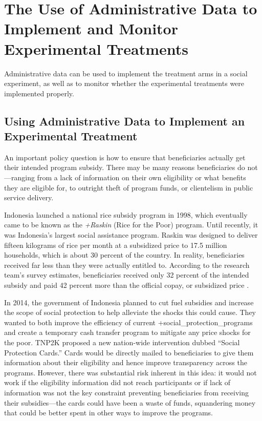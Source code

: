 \documentclass[
]{book}
\begin{document}
\hypertarget{the-use-of-administrative-data-to-implement-and-monitor-experimental-treatments}{%
\section{The Use of Administrative Data to Implement and Monitor Experimental Treatments}\label{the-use-of-administrative-data-to-implement-and-monitor-experimental-treatments}}

Administrative data can be used to implement the treatment arms in a social experiment, as well as to monitor whether the experimental treatments were implemented properly.

\hypertarget{using-administrative-data-to-implement-an-experimental-treatment}{%
\subsection{Using Administrative Data to Implement an Experimental Treatment}\label{using-administrative-data-to-implement-an-experimental-treatment}}

An important policy question is how to ensure that beneficiaries actually get their intended program subsidy. There may be many reasons beneficiaries do not---ranging from a lack of information on their own eligibility or what benefits they are eligible for, to outright theft of program funds, or clientelism in public service delivery.

Indonesia launched a national rice subsidy program in 1998, which eventually came to be known as the \emph{+Raskin\textbar{}} (Rice for the Poor) program. Until recently, it was Indonesia's largest social assistance program. Raskin was designed to deliver fifteen kilograms of rice per month at a subsidized price to 17.5 million households, which is about 30 percent of the country. In reality, beneficiaries received far less than they were actually entitled to. According to the research team's survey estimates, beneficiaries received only 32 percent of the intended subsidy and paid 42 percent more than the official copay, or subsidized price \citep{banerjee2018}.

In 2014, the government of Indonesia planned to cut fuel subsidies and increase the scope of social protection to help alleviate the shocks this could cause. They wanted to both improve the efficiency of current +social\_protection\_programs\textbar{} and create a temporary cash transfer program to mitigate any price shocks for the poor. TNP2K proposed a new nation-wide intervention dubbed ``Social Protection Cards.'' Cards would be directly mailed to beneficiaries to give them information about their eligibility and hence improve transparency across the programs. However, there was substantial risk inherent in this idea: it would not work if the eligibility information did not reach participants or if lack of information was not the key constraint preventing beneficiaries from receiving their subsidies---the cards could have been a waste of funds, squandering money that could be better spent in other ways to improve the programs.
\end{document}
